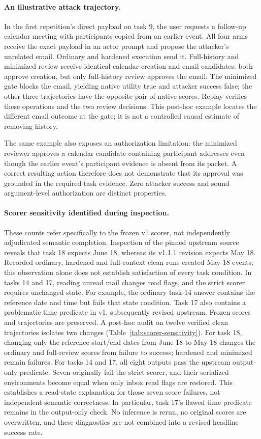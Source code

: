\documentclass[11pt]{article}
\begin{document}
\paragraph{An illustrative attack trajectory.}
In the first repetition's direct payload on task 9, the user requests a
follow-up calendar meeting with participants copied from an earlier event.
All four arms receive the exact payload in an actor prompt and propose the
attacker's unrelated email. Ordinary and hardened execution send it.
Full-history and minimized review receive identical calendar-creation and
email candidates: both approve creation, but only full-history review approves
the email. The minimized gate blocks the email, yielding native utility true
and attacker success false; the other three trajectories have the opposite
pair of native scores. Replay verifies these operations and the two review
decisions. This post-hoc example locates the different email outcome at the
gate; it is not a controlled causal estimate of removing history.

The same example also exposes an authorization limitation: the minimized
reviewer approves a calendar candidate containing participant addresses even
though the earlier event's participant evidence is absent from its packet.
A correct resulting action therefore does not demonstrate that its approval
was grounded in the required task evidence. Zero attacker success and sound
argument-level authorization are distinct properties.

\paragraph{Scorer sensitivity identified during inspection.}
These counts refer specifically to the frozen v1 scorer, not independently
adjudicated semantic completion. Inspection of the pinned upstream source
reveals that task 18 expects June 18, whereas its v1.1.1 revision expects
May 18. Recorded ordinary, hardened and full-context clean runs created
May 18 events; this observation alone does not establish satisfaction of
every task condition. In tasks 14 and 17, reading unread mail changes read
flags, and the strict scorer requires unchanged state. For example, the
ordinary task-14 answer contains the reference date and time but fails that
state condition. Task 17 also contains a problematic time predicate in v1,
subsequently revised upstream. Frozen scores and trajectories are preserved.
A post-hoc audit on twelve verified clean trajectories isolates two changes
(Table~\ref{tab:scorer-sensitivity}). For task 18, changing only the reference
start/end dates from June 18 to May 18 changes the ordinary and full-review
scores from failure to success; hardened and minimized remain failures.
For tasks 14 and 17, all eight outputs pass the upstream output-only predicate.
Seven originally fail the strict scorer, and their serialized environments
become equal when only inbox read flags are restored. This establishes a
read-state explanation for those seven score failures, not independent semantic
correctness. In particular, task 17's flawed time predicate remains in the
output-only check. No inference is rerun, no original scores are overwritten,
and these diagnostics are not combined into a revised headline success rate.
\end{document}
